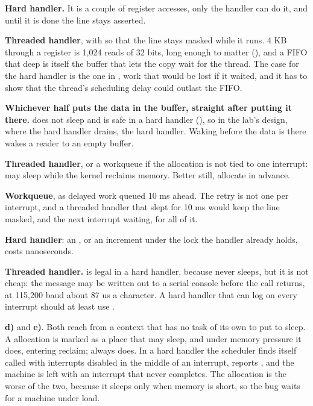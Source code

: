 
 \textbf{Hard handler.} It is a couple of register accesses, only the handler can do it,
and until it is done the line stays asserted.

 \textbf{Threaded handler}, with  so that the line stays masked while it
runs. 4 KB through a register is 1,024 reads of 32 bits, long enough to matter (),
and a FIFO that deep is itself the buffer that lets the copy wait for the thread. The case for the
hard handler is the one in , work that would be lost if it waited, and it has to
show that the thread's scheduling delay could outlast the FIFO.

 \textbf{Whichever half puts the data in the buffer, straight after putting it there.}
 does not sleep and is safe in a hard handler (), so
in the lab's design, where the hard handler drains, the hard handler. Waking before the data is
there wakes a reader to an empty buffer.

 \textbf{Threaded handler}, or a workqueue if the allocation is not tied to one interrupt:
 may sleep while the kernel reclaims memory. Better still, allocate in advance.

 \textbf{Workqueue}, as delayed work queued 10 ms ahead. The retry is not one per
interrupt, and a threaded handler that slept for 10 ms would keep the line masked, and the next
interrupt waiting, for all of it.

 \textbf{Hard handler}: an , or an increment under the lock the handler
already holds, costs nanoseconds.

 \textbf{Threaded handler.}  is legal in a hard handler, because
 never sleeps, but it is not cheap: the message may be written out to a serial console
before the call returns, at 115,200 baud about 87 us a character. A hard handler that can log on
every interrupt should at least use .

 \textbf{d)} and \textbf{e)}. Both reach  from a context that has no
task of its own to put to sleep. A  allocation is marked as a place that may
sleep, and under memory pressure it does, entering reclaim;  always does. In a hard
handler the scheduler finds itself called with interrupts disabled in the middle of an interrupt,
reports , and the machine is left with an interrupt that never
completes. The allocation is the worse of the two, because it sleeps only when memory is short, so
the bug waits for a machine under load.


